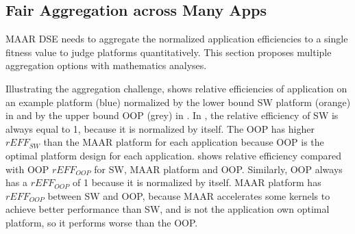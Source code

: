 \vspace{-2pt}
\subsection{Fair Aggregation across Many Apps}
\label{subsec:aggregation}

MAAR DSE needs to aggregate the normalized application efficiencies to a single fitness value to judge platforms quantitatively. This section proposes multiple aggregation options with mathematics analyses.

Illustrating the aggregation challenge,  shows relative efficiencies of application on an example platform (blue) normalized by the lower bound SW platform (orange) in  and by the upper bound OOP (grey) in . In , the relative efficiency of SW is always equal to 1, because it is normalized by itself. The OOP has higher $rEFF_{SW}$ than the MAAR platform for each application because OOP is the optimal platform design for each application.  shows relative efficiency compared with OOP $rEFF_{OOP}$ for SW, MAAR platform and OOP. Similarly, OOP always has a $rEFF_{OOP}$ of 1 because it is normalized by itself. MAAR platform has $rEFF_{OOP}$ between SW and OOP, because MAAR accelerates some kernels to achieve better performance than SW, and is not the application own optimal platform, so it performs worse than the OOP.






   








